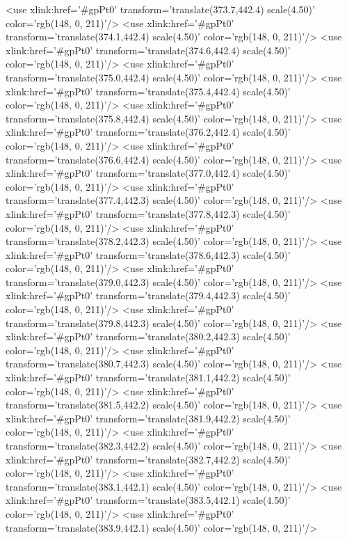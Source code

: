 	<use xlink:href='#gpPt0' transform='translate(373.7,442.4) scale(4.50)' color='rgb(148,   0, 211)'/>
	<use xlink:href='#gpPt0' transform='translate(374.1,442.4) scale(4.50)' color='rgb(148,   0, 211)'/>
	<use xlink:href='#gpPt0' transform='translate(374.6,442.4) scale(4.50)' color='rgb(148,   0, 211)'/>
	<use xlink:href='#gpPt0' transform='translate(375.0,442.4) scale(4.50)' color='rgb(148,   0, 211)'/>
	<use xlink:href='#gpPt0' transform='translate(375.4,442.4) scale(4.50)' color='rgb(148,   0, 211)'/>
	<use xlink:href='#gpPt0' transform='translate(375.8,442.4) scale(4.50)' color='rgb(148,   0, 211)'/>
	<use xlink:href='#gpPt0' transform='translate(376.2,442.4) scale(4.50)' color='rgb(148,   0, 211)'/>
	<use xlink:href='#gpPt0' transform='translate(376.6,442.4) scale(4.50)' color='rgb(148,   0, 211)'/>
	<use xlink:href='#gpPt0' transform='translate(377.0,442.4) scale(4.50)' color='rgb(148,   0, 211)'/>
	<use xlink:href='#gpPt0' transform='translate(377.4,442.3) scale(4.50)' color='rgb(148,   0, 211)'/>
	<use xlink:href='#gpPt0' transform='translate(377.8,442.3) scale(4.50)' color='rgb(148,   0, 211)'/>
	<use xlink:href='#gpPt0' transform='translate(378.2,442.3) scale(4.50)' color='rgb(148,   0, 211)'/>
	<use xlink:href='#gpPt0' transform='translate(378.6,442.3) scale(4.50)' color='rgb(148,   0, 211)'/>
	<use xlink:href='#gpPt0' transform='translate(379.0,442.3) scale(4.50)' color='rgb(148,   0, 211)'/>
	<use xlink:href='#gpPt0' transform='translate(379.4,442.3) scale(4.50)' color='rgb(148,   0, 211)'/>
	<use xlink:href='#gpPt0' transform='translate(379.8,442.3) scale(4.50)' color='rgb(148,   0, 211)'/>
	<use xlink:href='#gpPt0' transform='translate(380.2,442.3) scale(4.50)' color='rgb(148,   0, 211)'/>
	<use xlink:href='#gpPt0' transform='translate(380.7,442.3) scale(4.50)' color='rgb(148,   0, 211)'/>
	<use xlink:href='#gpPt0' transform='translate(381.1,442.2) scale(4.50)' color='rgb(148,   0, 211)'/>
	<use xlink:href='#gpPt0' transform='translate(381.5,442.2) scale(4.50)' color='rgb(148,   0, 211)'/>
	<use xlink:href='#gpPt0' transform='translate(381.9,442.2) scale(4.50)' color='rgb(148,   0, 211)'/>
	<use xlink:href='#gpPt0' transform='translate(382.3,442.2) scale(4.50)' color='rgb(148,   0, 211)'/>
	<use xlink:href='#gpPt0' transform='translate(382.7,442.2) scale(4.50)' color='rgb(148,   0, 211)'/>
	<use xlink:href='#gpPt0' transform='translate(383.1,442.1) scale(4.50)' color='rgb(148,   0, 211)'/>
	<use xlink:href='#gpPt0' transform='translate(383.5,442.1) scale(4.50)' color='rgb(148,   0, 211)'/>
	<use xlink:href='#gpPt0' transform='translate(383.9,442.1) scale(4.50)' color='rgb(148,   0, 211)'/>
